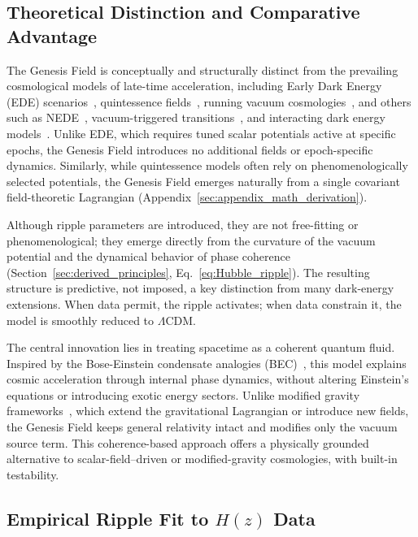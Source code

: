 \subsection{Theoretical Distinction and Comparative Advantage}

The Genesis Field is conceptually and structurally distinct from the prevailing cosmological models of late-time acceleration, including Early Dark Energy (EDE) scenarios~\cite{Poulin2019,Smith2020}, quintessence fields~\cite{Caldwell1998}, running vacuum cosmologies~\cite{sola2023}, and others such as NEDE~\cite{Niedermann2021}, vacuum-triggered transitions~\cite{Freese2022}, and interacting dark energy models~\cite{DiValentino2020}. Unlike EDE, which requires tuned scalar potentials active at specific epochs, the Genesis Field introduces no additional fields or epoch-specific dynamics. Similarly, while quintessence models often rely on phenomenologically selected potentials, the Genesis Field emerges naturally from a single covariant field-theoretic Lagrangian (Appendix~\ref{sec:appendix_math_derivation}).

Although ripple parameters are introduced, they are not free-fitting or phenomenological; they emerge directly from the curvature of the vacuum potential and the dynamical behavior of phase coherence (Section~\ref{sec:derived_principles}, Eq.~\ref{eq:Hubble_ripple}). The resulting structure is predictive, not imposed, a key distinction from many dark-energy extensions. When data permit, the ripple activates; when data constrain it, the model is smoothly reduced to \(\Lambda\)CDM.

The central innovation lies in treating spacetime as a coherent quantum fluid. Inspired by the Bose-Einstein condensate analogies (BEC)~\cite{volovik2003universe,Barcelo2005}, this model explains cosmic acceleration through internal phase dynamics, without altering Einstein’s equations or introducing exotic energy sectors. Unlike modified gravity frameworks~\cite{Clifton2012,Nojiri2017}, which extend the gravitational Lagrangian or introduce new fields, the Genesis Field keeps general relativity intact and modifies only the vacuum source term. This coherence-based approach offers a physically grounded alternative to scalar-field–driven or modified-gravity cosmologies, with built-in testability.

\subsection{Empirical Ripple Fit to \texorpdfstring{$H(z)$}{H(z)} Data}
\label{sec:ripple_fit}

